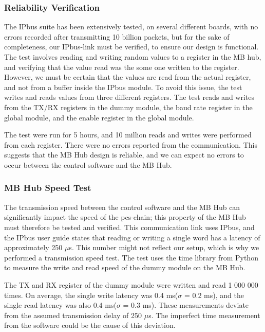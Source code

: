 \documentclass[main.tex]{subfiles}
\begin{document}
\subsubsection{Reliability Verification}

The IPbus suite has been extensively tested, on several different boards, with no errors recorded after transmitting 10 billion packets\cite{IPbus}, but for the sake of completeness, our IPbus-link must be verified, to ensure our design is functional. The test involves reading and writing random values to a register in the MB hub, and verifying that the value read was the some one written to the register. However, we must be certain that the values are read from the actual register, and not from a buffer inside the IPbus module. To avoid this issue, the test writes and reads values from three different registers. The test reads and writes from the TX/RX registers in the dummy module, the baud rate register in the global module, and the enable register in the global module.

The test were run for 5 hours, and 10 million reads and writes were performed from each register. There were no errors reported from the communication. This suggests that the MB Hub design is reliable, and we can expect no errors to occur between the control software and the MB Hub.

\subsubsection{MB Hub Speed Test}

The transmission speed between the control software and the MB Hub can significantly impact the speed of the \gls{pcs}-chain; this property of the MB Hub must therefore be tested and verified. This communication link uses IPbus, and the IPbus user guide states that reading or writing a single word has a latency of approximately 250 $\mu$s\cite{ipbus_guide}. This number might not reflect our setup, which is why we performed a transmission speed test. The test uses the time library from Python to measure the write and read speed of the dummy module on the MB Hub.

The TX and RX register of the dummy module were written and read 1 000 000 times. On average, the single write latency was 0.4 ms($\sigma$ = 0.2 ms), and the single read latency was also 0.4 ms($\sigma$ = 0.3 ms). These measurements deviate from the assumed transmission delay of 250 $\mu$s. The imperfect time measurement from the software could be the cause of this deviation.
\end{document}
